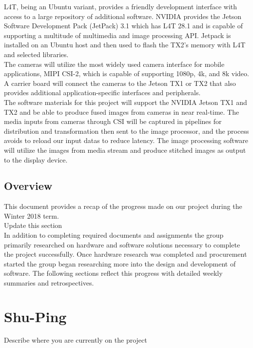 \documentclass[letterpaper,10pt,serif,draftclsnofoot,onecolumn,compsoc,titlepage]{IEEEtran}
\begin{document}
L4T, being an Ubuntu variant, provides a friendly development interface with access to a 
large repository of additional software.
NVIDIA provides the Jetson Software Development Pack (JetPack) 3.1 which has L4T 28.1 
and is capable of supporting a multitude of multimedia and image processing API. Jetpack 
is installed on an Ubuntu host and then used to flash the TX2's memory with L4T and 
selected libraries. \\

The cameras will utilize the most widely used camera interface for mobile applications, 
MIPI CSI-2, which is capable of supporting 1080p, 4k, and 8k video. 
A carrier board will connect the cameras to the Jetson TX1 or TX2 that also provides 
additional application-specific interfaces and peripherals. \\

The software materials for this project will support the NVIDIA Jetson TX1 and TX2 and 
be able to produce fused images from cameras in near real-time. The media inputs from 
cameras through CSI will be captured in pipelines for distribution and transformation 
then sent to the image processor, and the process avoids to reload our input datas to 
reduce latency. The image processing software will utilize the images from media stream 
and produce stitched images as output to the display device.  \\

\subsection{Overview}
This document provides a recap of the progress made on our project during the 
Winter 2018 term. \\

Update this section \\

In addition to completing required documents and assignments the group primarily 
researched on hardware and software solutions necessary to complete the project 
successfully. Once hardware research was completed and procurement started the group 
began researching more into the design and development of software. The following 
sections reflect this progress with detailed weekly summaries and retrospectives. \\


\section{Shu-Ping}
Describe where you are currently on the project \\
\end{document}
